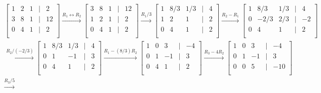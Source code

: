\documentclass[../../linear_algebra.tex]{subfiles}
\begin{document}
\begin{gather*}
    \begin{bmatrix}
    1 &2 &1 &\vert &2\\
    3 &8 &1 &\vert &12\\
    0 &4 &1 &\vert &2\\
    \end{bmatrix} \overset{R_{1} \leftrightarrow R_{2}}\rightarrow
    \begin{bmatrix}
    3 &8 &1 &\vert &12\\
    1 &2 &1 &\vert &2\\
    0 &4 &1 &\vert &2\\
    \end{bmatrix} \overset{R_{1}/3}\rightarrow
    \begin{bmatrix}
    1 &8/3 &1/3 &\vert &4\\
    1 &2 &1 &\vert &2\\
    0 &4 &1 &\vert &2\\
    \end{bmatrix} \overset{R_{2} - R_{1}}\rightarrow
    \begin{bmatrix}
    1 &8/3 &1/3 &\vert &4\\
    0 &-2/3 &2/3 &\vert &-2\\
    0 &4 &1 &\vert &2\\
    \end{bmatrix}\\
    \overset{R_{2} / (-2/3)}\rightarrow
    \begin{bmatrix}
    1 &8/3 &1/3 &\vert &4\\
    0 &1 &-1 &\vert &3\\
    0 &4 &1 &\vert &2\\
    \end{bmatrix} \overset{R_{1} - (8/3) R_{2}}\rightarrow
    \begin{bmatrix}
    1 &0 &3 &\vert &-4\\
    0 &1 &-1 &\vert &3\\
    0 &4 &1 &\vert &2\\
    \end{bmatrix} \overset{R_{3} - 4 R_{2}}\rightarrow
    \begin{bmatrix}
    1 &0 &3 &\vert &-4\\
    0 &1 &-1 &\vert &3\\
    0 &0 &5 &\vert &-10\\
    \end{bmatrix}\\
    \overset{R_{3}/5}\rightarrow

\end{gather*}
\end{document}

